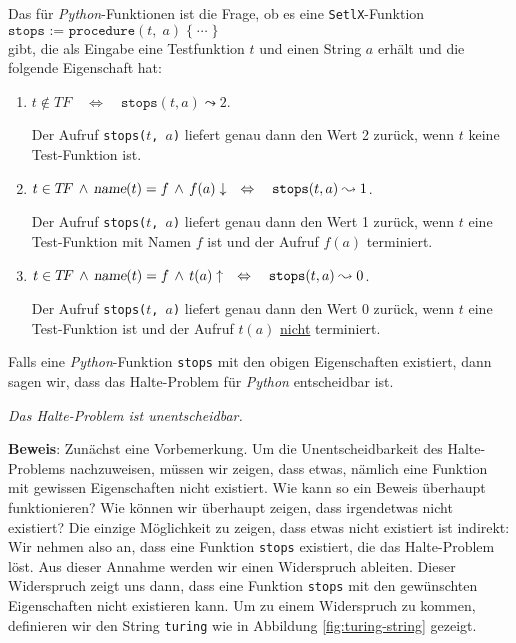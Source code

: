 \noindent
Das  für
\textsl{Python}-Funktionen ist die Frage, ob es eine \texttt{SetlX}-Funktion \\[0.1cm] 
\hspace*{1.3cm} 
$\texttt{stops := procedure}(t,\;a)\; \{\;\cdots\;\}$ \\[0.1cm]
gibt, die als Eingabe eine Testfunktion $t$ und einen String $a$ erhält und die folgende
Eigenschaft hat:
\begin{enumerate}
\item $t \not\in T\!F \quad\Leftrightarrow\quad \mathtt{stops}(t, a) \leadsto 2$.

      Der Aufruf \texttt{stops($t$, $a$)} liefert genau dann den Wert 2 zurück, 
      wenn $t$ keine Test-Funktion ist.
\item $t \in T\!F \,\wedge\, \textsl{name}(t) = f \,\wedge\, f(a)\downarrow \quad\Leftrightarrow\quad
       \mathtt{stops}(t, a) \leadsto 1$.

      Der Aufruf \texttt{stops($t$, $a$)} liefert genau dann den Wert 1 zurück,
      wenn $t$ eine Test-Funktion mit Namen $f$ ist und der Aufruf $f(a)$ terminiert.

\item $t \in T\!F  \,\wedge\, \textsl{name}(t) = f \,\wedge\, t(a)\uparrow \quad\Leftrightarrow\quad
       \mathtt{stops}(t, a) \leadsto 0$.

      Der Aufruf \texttt{stops($t$, $a$)} liefert genau dann den Wert 0 zurück,
      wenn $t$ eine Test-Funktion ist und der Aufruf $t(a)$ \underline{nicht} terminiert.
\end{enumerate}
Falls eine \textsl{Python}-Funktion \texttt{stops} mit den obigen Eigenschaften existiert, dann
sagen wir, dass das Halte-Problem für \textsl{Python} entscheidbar ist.

\begin{Theorem}
{\em
  Das Halte-Problem ist unentscheidbar.
} 
\end{Theorem}

\noindent
\textbf{Beweis}:  Zunächst eine Vorbemerkung.  Um die Unentscheidbarkeit des
Halte-Problems nachzuweisen, müssen wir zeigen, dass etwas, nämlich eine Funktion mit
gewissen Eigenschaften nicht existiert.  Wie kann so ein Beweis überhaupt funktionieren?
Wie können wir überhaupt zeigen, dass irgendetwas nicht existiert?
Die einzige Möglichkeit zu zeigen, dass etwas nicht existiert ist indirekt:
Wir nehmen also an, dass eine Funktion \texttt{stops} existiert, die das Halte-Problem löst.
Aus dieser Annahme werden wir einen Widerspruch ableiten.  Dieser Widerspruch zeigt
uns dann, dass eine Funktion \texttt{stops} mit den gewünschten Eigenschaften nicht
existieren kann.
Um zu einem Widerspruch zu kommen, definieren wir den String \texttt{turing} wie in Abbildung
\ref{fig:turing-string} gezeigt.

